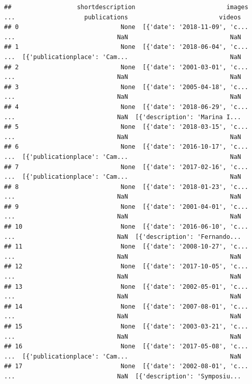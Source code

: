 \documentclass[
]{book}
\begin{document}
\begin{verbatim}
##                  shortdescription                         images  ...                   publications                         videos
## 0                            None  [{'date': '2018-11-09', 'c...  ...                            NaN                            NaN
## 1                            None  [{'date': '2018-06-04', 'c...  ...  [{'publicationplace': 'Cam...                            NaN
## 2                            None  [{'date': '2001-03-01', 'c...  ...                            NaN                            NaN
## 3                            None  [{'date': '2005-04-18', 'c...  ...                            NaN                            NaN
## 4                            None  [{'date': '2018-06-29', 'c...  ...                            NaN  [{'description': 'Marina I...
## 5                            None  [{'date': '2018-03-15', 'c...  ...                            NaN                            NaN
## 6                            None  [{'date': '2016-10-17', 'c...  ...  [{'publicationplace': 'Cam...                            NaN
## 7                            None  [{'date': '2017-02-16', 'c...  ...  [{'publicationplace': 'Cam...                            NaN
## 8                            None  [{'date': '2018-01-23', 'c...  ...                            NaN                            NaN
## 9                            None  [{'date': '2001-04-01', 'c...  ...                            NaN                            NaN
## 10                           None  [{'date': '2016-06-10', 'c...  ...                            NaN  [{'description': 'Fernando...
## 11                           None  [{'date': '2008-10-27', 'c...  ...                            NaN                            NaN
## 12                           None  [{'date': '2017-10-05', 'c...  ...                            NaN                            NaN
## 13                           None  [{'date': '2002-05-01', 'c...  ...                            NaN                            NaN
## 14                           None  [{'date': '2007-08-01', 'c...  ...                            NaN                            NaN
## 15                           None  [{'date': '2003-03-21', 'c...  ...                            NaN                            NaN
## 16                           None  [{'date': '2017-05-08', 'c...  ...  [{'publicationplace': 'Cam...                            NaN
## 17                           None  [{'date': '2002-08-01', 'c...  ...                            NaN  [{'description': 'Symposiu...

\end{verbatim}
\end{document}
